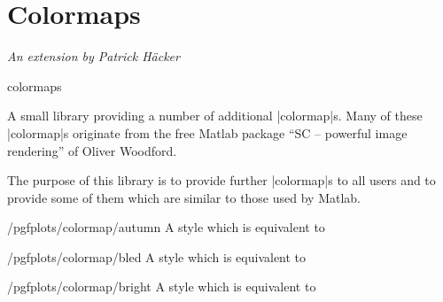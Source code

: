 
\section[libs.colormaps]{Colormaps}
\begingroup
\def\pgfplotsmanualcurlibrary{colormaps}

{\emph{An extension by Patrick Häcker}}


\begin{pgfplotslibrary}{colormaps}

A small library providing a number of additional |colormap|s. Many of these
|colormap|s originate from the free Matlab package ``SC -- powerful image
rendering'' of Oliver Woodford.

The purpose of this library is to provide further |colormap|s to all users and
to provide some of them which are similar to those used by
Matlab\textregistered{}.

\begin{stylekey}{/pgfplots/colormap/autumn}
    A style which is equivalent to
\begin{codeexample}
\end{codeexample}
     \par \matlabcolormaptext
\end{stylekey}

\begin{stylekey}{/pgfplots/colormap/bled}
    A style which is equivalent to
\begin{codeexample}
\end{codeexample}
     \par \matlabcolormaptext
\end{stylekey}

\begin{stylekey}{/pgfplots/colormap/bright}
    A style which is equivalent to
\begin{codeexample}
\end{codeexample}
     \par \matlabcolormaptext
\end{stylekey}


\end{pgfplotslibrary}
